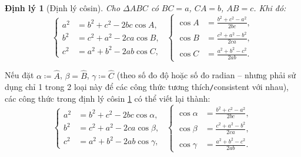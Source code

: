 \documentclass[oneside]{book}
\numberwithin{equation}{section}
\newtheorem{dinhly}{Định lý}[section]
\begin{document}
\begin{dinhly}[Định lý côsin]
	\label{thm: cos theorem}
	Cho $\Delta ABC$ có $BC = a$, $CA = b$, $AB = c$. Khi đó:
	\begin{equation*}
		\left\{\begin{split}
			a^2 &= b^2 + c^2 - 2bc\cos A,\\
			b^2 &= c^2 + a^2 - 2ca\cos B,\\
			c^2 &= a^2 + b^2 - 2ab\cos C,
		\end{split}\right.\ \ \left\{\begin{split}
			\cos A &= \frac{b^2 + c^2 - a^2}{2bc},\\
			\cos B &= \frac{c^2 + a^2 - b^2}{2ca},\\
			\cos C &= \frac{a^2 + b^2 - c^2}{2ab}.
	\end{split}\right.		
	\end{equation*}
\end{dinhly}
Nếu đặt $\alpha\coloneqq\widehat{A}$, $\beta = \widehat{B}$, $\gamma\coloneqq\widehat{C}$ (theo số đo độ hoặc số đo radian -- nhưng phải sử dụng chỉ 1 trong 2 loại này để các công thức tương thích\texttt{/}consistent với nhau), các công thức trong định lý côsin \ref{thm: cos theorem} có thể viết lại thành:
\begin{equation*}
	\left\{\begin{split}
		a^2 &= b^2 + c^2 - 2bc\cos\alpha,\\
		b^2 &= c^2 + a^2 - 2ca\cos\beta,\\
		c^2 &= a^2 + b^2 - 2ab\cos\gamma,
	\end{split}\right.\ \ \left\{\begin{split}
		\cos\alpha &= \frac{b^2 + c^2 - a^2}{2bc},\\
		\cos\beta &= \frac{c^2 + a^2 - b^2}{2ca},\\
		\cos\gamma &= \frac{a^2 + b^2 - c^2}{2ab}.
	\end{split}\right.		
\end{equation*}
\end{document}
